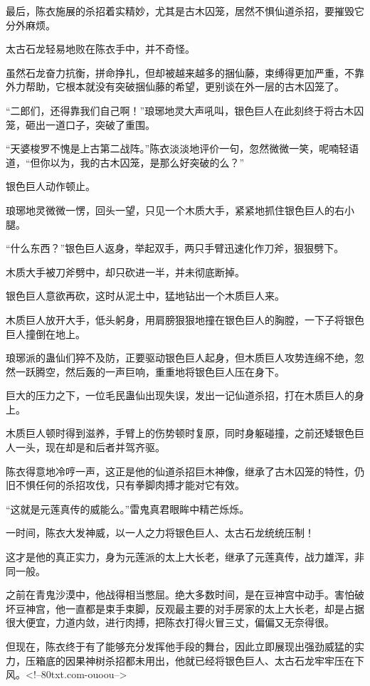 \begin{this_body}
最后，陈衣施展的杀招着实精妙，尤其是古木囚笼，居然不惧仙道杀招，要摧毁它分外麻烦。

太古石龙轻易地败在陈衣手中，并不奇怪。

虽然石龙奋力抗衡，拼命挣扎，但却被越来越多的捆仙藤，束缚得更加严重，不靠外力帮助，它根本就没有突破捆仙藤的希望，更别谈在外一层的古木囚笼了。

“二郎们，还得靠我们自己啊！”琅琊地灵大声吼叫，银色巨人在此刻终于将古木囚笼，砸出一道口子，突破了重围。

“天婆梭罗不愧是上古第二战阵。”陈衣淡淡地评价一句，忽然微微一笑，呢喃轻语道，“但你以为，我的古木囚笼，是那么好突破的么？”

银色巨人动作顿止。

琅琊地灵微微一愣，回头一望，只见一个木质大手，紧紧地抓住银色巨人的右小腿。

“什么东西？”银色巨人返身，举起双手，两只手臂迅速化作刀斧，狠狠劈下。

木质大手被刀斧劈中，却只砍进一半，并未彻底断掉。

银色巨人意欲再砍，这时从泥土中，猛地钻出一个木质巨人来。

木质巨人放开大手，低头躬身，用肩膀狠狠地撞在银色巨人的胸膛，一下子将银色巨人撞倒在地上。

琅琊派的蛊仙们猝不及防，正要驱动银色巨人起身，但木质巨人攻势连绵不绝，忽然一跃腾空，然后轰的一声巨响，重重地将银色巨人压在身下。

巨大的压力之下，一位毛民蛊仙出现失误，发出一记仙道杀招，打在木质巨人的身上。

木质巨人顿时得到滋养，手臂上的伤势顿时复原，同时身躯碰撞，之前还矮银色巨人一头，现在却是和后者并驾齐驱。

陈衣得意地冷哼一声，这正是他的仙道杀招巨木神像，继承了古木囚笼的特性，仍旧不惧任何的杀招攻伐，只有拳脚肉搏才能对它有效。

“这就是元莲真传的威能么。”雷鬼真君眼眸中精芒烁烁。

一时间，陈衣大发神威，以一人之力将银色巨人、太古石龙统统压制！

这才是他的真正实力，身为元莲派的太上大长老，继承了元莲真传，战力雄浑，非同一般。

之前在青鬼沙漠中，他战得相当憋屈。绝大多数时间，是在豆神宫中动手。害怕破坏豆神宫，他一直都是束手束脚，反观最主要的对手房家的太上大长老，却是占据很大便宜，力道内敛，进行肉搏，把陈衣打得火冒三丈，偏偏又无奈得很。

但现在，陈衣终于有了能够充分发挥他手段的舞台，因此立即展现出强劲威猛的实力，压箱底的因果神树杀招都未用出，他就已经将银色巨人、太古石龙牢牢压在下风。<!--80txt.com-ouoou-->

\end{this_body}

